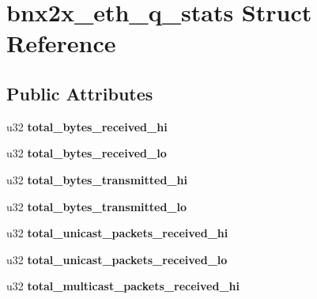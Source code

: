 \hypertarget{structbnx2x__eth__q__stats}{
\section{bnx2x\_\-eth\_\-q\_\-stats Struct Reference}
\label{structbnx2x__eth__q__stats}
}
\subsection*{Public Attributes}
\begin{DoxyCompactItemize}
\item 
\hypertarget{structbnx2x__eth__q__stats_ae1bae6df73f7e94d3b245d1a458a5452}{
u32 {\bfseries total\_\-bytes\_\-received\_\-hi}}
\label{structbnx2x__eth__q__stats_ae1bae6df73f7e94d3b245d1a458a5452}

\item 
\hypertarget{structbnx2x__eth__q__stats_aee35166e6697cea663541150551c92c7}{
u32 {\bfseries total\_\-bytes\_\-received\_\-lo}}
\label{structbnx2x__eth__q__stats_aee35166e6697cea663541150551c92c7}

\item 
\hypertarget{structbnx2x__eth__q__stats_ab0567449a951363150dc81242db81eda}{
u32 {\bfseries total\_\-bytes\_\-transmitted\_\-hi}}
\label{structbnx2x__eth__q__stats_ab0567449a951363150dc81242db81eda}

\item 
\hypertarget{structbnx2x__eth__q__stats_ad66688d32c9b4c6b8880da0979ff70a9}{
u32 {\bfseries total\_\-bytes\_\-transmitted\_\-lo}}
\label{structbnx2x__eth__q__stats_ad66688d32c9b4c6b8880da0979ff70a9}

\item 
\hypertarget{structbnx2x__eth__q__stats_a894f4163090f9bd9e7bc8e7f1df65663}{
u32 {\bfseries total\_\-unicast\_\-packets\_\-received\_\-hi}}
\label{structbnx2x__eth__q__stats_a894f4163090f9bd9e7bc8e7f1df65663}

\item 
\hypertarget{structbnx2x__eth__q__stats_a131134c4015ca2f601008e5b092ba729}{
u32 {\bfseries total\_\-unicast\_\-packets\_\-received\_\-lo}}
\label{structbnx2x__eth__q__stats_a131134c4015ca2f601008e5b092ba729}

\item 
\hypertarget{structbnx2x__eth__q__stats_a8f435218457213972bde56775742baa5}{
u32 {\bfseries total\_\-multicast\_\-packets\_\-received\_\-hi}}
\label{structbnx2x__eth__q__stats_a8f435218457213972bde56775742baa5}


\end{DoxyCompactItemize}
